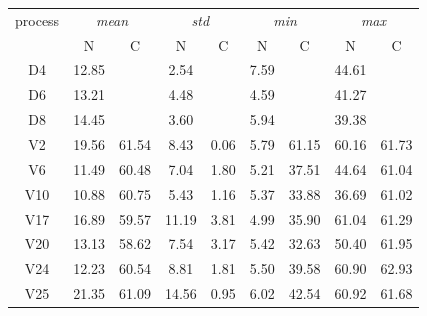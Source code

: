 \documentclass[12 pt]{scrartcl}
\begin{document}
\begin{table}[ht]
  \centering
  \label{tab:aacfstats}
  \begin{tabular}{c|cc|cc|cc|cc}
    process & \multicolumn{2}{c|}{\emph{mean}} & \multicolumn{2}{c|}{\emph{std}} & \multicolumn{2}{c|}{\emph{min}} & \multicolumn{2}{c}{\emph{max}}                                \\
            & N                                & C                               & N                               & C                              & N    & C     & N     & C     \\
    \hline
    D4      & 12.85                            &                                 & 2.54                            &                                & 7.59 &       & 44.61 &       \\
    D6      & 13.21                            &                                 & 4.48                            &                                & 4.59 &       & 41.27 &       \\
    D8      & 14.45                            &                                 & 3.60                            &                                & 5.94 &       & 39.38 &       \\
    V2      & 19.56                            & 61.54                           & 8.43                            & 0.06                           & 5.79 & 61.15 & 60.16 & 61.73 \\
    V6      & 11.49                            & 60.48                           & 7.04                            & 1.80                           & 5.21 & 37.51 & 44.64 & 61.04 \\
    V10     & 10.88                            & 60.75                           & 5.43                            & 1.16                           & 5.37 & 33.88 & 36.69 & 61.02 \\
    V17     & 16.89                            & 59.57                           & 11.19                           & 3.81                           & 4.99 & 35.90 & 61.04 & 61.29 \\
    V20     & 13.13                            & 58.62                           & 7.54                            & 3.17                           & 5.42 & 32.63 & 50.40 & 61.95 \\
    V24     & 12.23                            & 60.54                           & 8.81                            & 1.81                           & 5.50 & 39.58 & 60.90 & 62.93 \\
    V25     & 21.35                            & 61.09                           & 14.56                           & 0.95                           & 6.02 & 42.54 & 60.92 & 61.68 \\
  \end{tabular}
\end{table}
\end{document}
